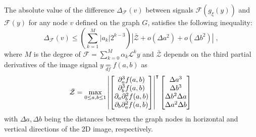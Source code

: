 \documentclass[10pt,journal,compsoc]{IEEEtran}
\newcommand{\df}{\mathop{=}\limits_{df}}
\newcommand{\norm}[1]{\left|#1\right|}
\begin{document}
	\begin{theorem}
		The absolute value of the difference $\Delta_\mathcal{F}(v)$ between signals $\mathcal{F}(g_\xi (y))$ and $\mathcal{F}(y)$ for any node $v$ defined on the graph $G$, satisfies the following inequality:
		\begin{equation}
		\Delta_\mathcal{F} (v) \leq \left( \sum_{k=1}^{M} \norm{a_k} 2^{k-3} \right) \norm{\bar{\mathcal{Z}} + o(\Delta a^2) + o(\Delta b^2)}\;,
		\label{eq:filt_diff}
		\end{equation} 
		\noindent
		where $M$ is the degree of $\mathcal{F} = \sum_{k=0}^M \alpha_k \mathcal{L}^k y$ and $\bar{\mathcal{Z}}$ depends on the third partial derivatives of the image signal $y \df f(a,b)$ as
		\begin{equation}
		\bar{\mathcal{Z}} = 
		\max_{0 \leq a,b \leq 1} \left|
		\begin{bmatrix}
		\partial^3_a f(a,b) \\
		\partial^3_b f(a,b) \\
		\partial_a\partial^2_b f(a,b) \\
		\partial_b\partial^2_a f(a,b) \\
		\end{bmatrix}
		\right|^{\intercal}
		\begin{bmatrix}
		\Delta a^3 \\
		\Delta b^3 \\
		\Delta b^2 \Delta a \\
		\Delta a^2 \Delta b \\
		\end{bmatrix} \\
		\label{eq:trans_z}
		\end{equation}
		\noindent
		with $\Delta a, \Delta b$ being the distances between the graph nodes in horizontal and vertical directions of the 2D image, respectively.
		\label{t:im_trans}
	\end{theorem}
	
\end{document}
